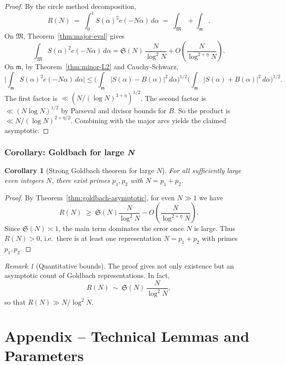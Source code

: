 \documentclass[11pt]{article}
\newtheorem{corollary}[lemma]{Corollary}
\theoremstyle{definition}
\theoremstyle{remark}
\newtheorem{remark}[lemma]{Remark}
\numberwithin{equation}{part}
\begin{document}
\begin{proof}
	By the circle method decomposition,
	\[
		R(N) \;=\;\int_0^1 S(\alpha)^2 e(-N\alpha)\,d\alpha
		\;=\;\int_{\mathfrak M}+\int_{\mathfrak m}.
	\]
	On $\mathfrak M$, Theorem~\ref{thm:major-eval} gives
	\[
		\int_{\mathfrak M} S(\alpha)^2 e(-N\alpha)\,d\alpha
		= \mathfrak S(N)\,\frac{N}{\log^2 N} + O\!\left(\frac{N}{\log^{2+\eta}N}\right).
	\]
	On $\mathfrak m$, by Theorem~\ref{thm:minor-L2} and Cauchy-Schwarz,
	\[
		\Biggl|\int_{\mathfrak m} S(\alpha)^2 e(-N\alpha)\,d\alpha\Biggr|
		\le \Biggl(\int_{\mathfrak m}|S(\alpha)-B(\alpha)|^2\,d\alpha\Biggr)^{1/2}
		\Biggl(\int_{\mathfrak m}|S(\alpha)+B(\alpha)|^2\,d\alpha\Biggr)^{1/2}.
	\]
	The first factor is $\ll (N/(\log N)^{3+\eta})^{1/2}$.
	The second factor is $\ll (N\log N)^{1/2}$ by Parseval and divisor bounds for $B$.
	So the product is $\ll N/(\log N)^{2+\eta/2}$.
	Combining with the major arcs yields the claimed asymptotic.
\end{proof}

\section{Corollary: Goldbach for large \textit{N}}

\begin{corollary}[Strong Goldbach theorem for large $N$]\label{cor:goldbach}
	For all sufficiently large even integers $N$, there exist primes $p_1,p_2$ with $N=p_1+p_2$.
\end{corollary}

\begin{proof}
	By Theorem~\ref{thm:goldbach-asymptotic}, for even $N\gg1$ we have
	\[
		R(N)\;\ge\;\mathfrak S(N)\frac{N}{\log^2 N} - O\!\left(\frac{N}{\log^{2+\eta}N}\right).
	\]
	Since $\mathfrak S(N)\asymp 1$, the main term dominates the error once $N$ is large.
	Thus $R(N)>0$, i.e.\ there is at least one representation $N=p_1+p_2$ with primes $p_1,p_2$.
\end{proof}

\begin{remark}[Quantitative bounds]
	The proof gives not only existence but an asymptotic count of Goldbach representations.
	In fact,
	\[
		R(N)\ \sim\ \mathfrak S(N)\,\frac{N}{\log^2 N},
	\]
	so that $R(N)\gg N/\log^2 N$.
\end{remark}


\part{Appendix -- Technical Lemmas and Parameters}
\end{document}
